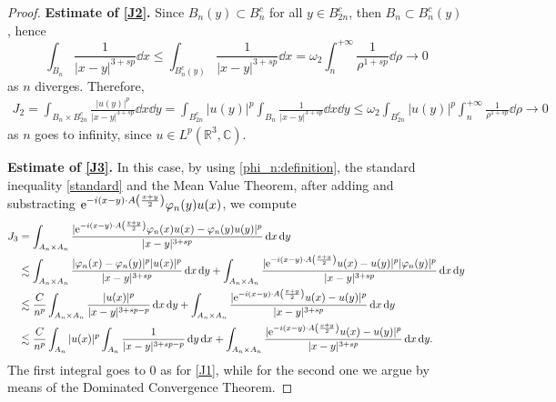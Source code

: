 \documentclass[leqno,11pt]{amsart}
\newcommand{\R}{\mathbb R}
\newcommand{\CC}{\mathbb C}
\numberwithin{equation}{section}
\def\e{{\rm e}}
\newcommand{\expAminus}{\e^{-i(x-y)\cdot A\left(\frac{x+y}{2}\right)}}
\begin{document}
\begin{proof}
{\bf Estimate of \eqref{J2}.}
Since $B_n(y) \subset B_n^c$ for all $y\in B_{2n}^c$, then $B_n \subset B^c_n(y)$, hence
\begin{equation}
    \int_{B_n}\frac{1}{|x-y|^{3+sp}}\dd x
    \leq 
    \int_{B^c_n(y)}\frac{1}{|x-y|^{3+sp}}\dd x
    =
    \omega_2\int_n^{+\infty} \frac{1}{\rho^{1+sp}} \dd \rho \to 0
\end{equation}
as $n$ diverges. Therefore,
\begin{equation}
    \begin{aligned}
        J_2
        =
        \int_{B_n \times B_{2n}^c}\frac{|u(y)|^p}{|x-y|^{3+sp}}\dd x \dd y 
        =
        \int_{B_{2n}^c}|u(y)|^p \int_ {B_n}\frac{1}{|x-y|^{3+sp}}\dd x \dd y
        \leq 
        \omega_2\int_{B_{2n}^c}|u(y)|^p \int_n^{+\infty} \frac{1}{\rho^{1+sp}} \dd \rho \to 0
    \end{aligned}
\end{equation}
as $n$ goes to infinity, since $u \in L^p(\R^3,\CC)$.

{\bf Estimate of \eqref{J3}.}
In this case, by using \eqref{phi_n:definition}, the standard inequality \eqref{standard} and the Mean Value Theorem, after adding and substracting $\expAminus\varphi_n(y)u(x)$, we compute
\begin{equation}
    \begin{aligned}
        J_3
        &=
        \int_{A_n \times A_n}\frac{|\expAminus\varphi_n(x)u(x)-\varphi_n(y)u(y)|^p}{|x-y|^{3+sp}}\dd x \dd y \\
        & \lesssim 
        \int_{A_n \times A_n}\frac{|\varphi_n(x)-\varphi_n(y)|^p |u(x)|^p}{|x-y|^{3+sp}}\dd x \dd y
        + 
        \int_{A_n \times A_n}\frac{|\expAminus u(x)- u(y)|^p|\varphi_n(y)|^p}{|x-y|^{3+sp}}\dd x \dd y \\
        & \lesssim 
        \frac{C}{n^p}\int_{A_n \times A_n}\frac{ |u(x)|^p}{|x-y|^{3+sp-p}}\dd x \dd y
        + 
        \int_{A_n \times A_n}\frac{|\expAminus u(x)- u(y)|^p}{|x-y|^{3+sp}}\dd x \dd y \\
        & \lesssim 
        \frac{C}{n^p}\int_{A_n}|u(x)|^p\int_{A_n}\frac{ 1}{|x-y|^{3+sp-p}}\dd y \dd x
        + 
        \int_{A_n \times A_n}\frac{|\expAminus u(x)- u(y)|^p}{|x-y|^{3+sp}}\dd x \dd y.
    \end{aligned}
\end{equation}
The first integral goes to $0$ as for \eqref{J1}, while for the second one we argue by means of the Dominated Convergence Theorem.




\end{proof}
\end{document}
